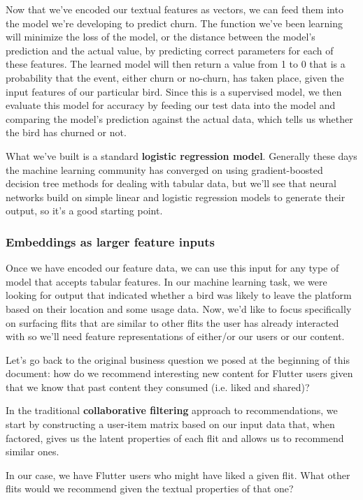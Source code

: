 \documentclass[11pt, table]{diazessay} %
\begin{document}
\begin{sloppypar}
Now that we've encoded our textual features as vectors, we can feed them into the model we're developing to predict churn. The function we've been learning will minimize the loss of the model, or the distance between the model's prediction and the actual value, by predicting correct parameters for each of these features. The learned model will then return a value from 1 to 0 that is a probability that the event, either churn or no-churn, has taken place, given the input features of our particular bird.  Since this is a supervised model, we then evaluate this model for accuracy by feeding our test data into the model and comparing the model's prediction against the actual data, which tells us whether the bird has churned or not.

What we've built is a standard \textbf{logistic regression model}. Generally these days the machine learning community has converged on using gradient-boosted decision tree methods for dealing with tabular data, but we'll see that neural networks build on simple linear and logistic regression models to generate their output, so it's a good starting point.

\subsubsection*{Embeddings as larger feature inputs}

Once we have encoded our feature data, we can use this input for any type of model that accepts tabular features.  In our machine learning task, we were looking for output that indicated whether a bird was likely to leave the platform based on their location and some usage data. Now, we'd like to focus specifically on surfacing flits that are similar to other flits the user has already interacted with so we'll need feature representations of either/or our users or our content.

Let's go back to the original business question we posed at the beginning of this document: how do we recommend interesting new content for Flutter users given that we know that past content they consumed (i.e. liked and shared)?

In the traditional \textbf{collaborative filtering} approach to recommendations, we start by constructing a user-item matrix based on our input data that, when factored, gives us the latent properties of each flit and allows us to recommend similar ones.

In our case, we have Flutter users who might have liked a given flit. What other flits would we recommend given the textual properties of that one?


\end{sloppypar}
\end{document}
